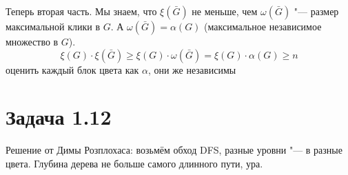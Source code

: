 	Теперь вторая часть.
	Мы знаем, что $\xi(\bar G)$ не меньше, чем $\omega(\bar G)$ "--- размер максимальной клики в $G$.
	А $\omega(\bar G)=\alpha(G)$ (максимальное независимое множество в $G$).
	\[
		\xi(G) \cdot \xi(\bar G) \ge \xi(G) \cdot \omega(\bar G) = \xi(G) \cdot \alpha(G) \ge n
	\]
	\TODO оценить каждый блок цвета как $\alpha$, они же независимы

\section{Задача 1.12}
	Решение от Димы Розплохаса: возьмём обход DFS, разные уровни "--- в разные цвета.
	Глубина дерева не больше самого длинного пути, ура.
